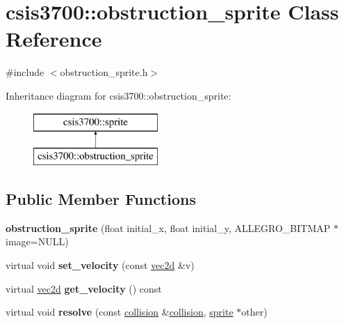 \hypertarget{classcsis3700_1_1obstruction__sprite}{\section{csis3700\-:\-:obstruction\-\_\-sprite Class Reference}
\label{classcsis3700_1_1obstruction__sprite}
}


{\ttfamily \#include $<$obstruction\-\_\-sprite.\-h$>$}

Inheritance diagram for csis3700\-:\-:obstruction\-\_\-sprite\-:\begin{figure}[H]
\begin{center}
\leavevmode
\includegraphics[height=2.000000cm]{classcsis3700_1_1obstruction__sprite}
\end{center}
\end{figure}
\subsection*{Public Member Functions}
\begin{DoxyCompactItemize}
\item 
\hypertarget{classcsis3700_1_1obstruction__sprite_a9d7f66afeeb3dba404c602b54eeb3308}{{\bfseries obstruction\-\_\-sprite} (float initial\-\_\-x, float initial\-\_\-y, A\-L\-L\-E\-G\-R\-O\-\_\-\-B\-I\-T\-M\-A\-P $\ast$image=N\-U\-L\-L)}\label{classcsis3700_1_1obstruction__sprite_a9d7f66afeeb3dba404c602b54eeb3308}

\item 
\hypertarget{classcsis3700_1_1obstruction__sprite_a6629cd0d13f54ed8666326ca55fb7c0c}{virtual void {\bfseries set\-\_\-velocity} (const \hyperlink{classcsis3700_1_1vec2d}{vec2d} \&v)}\label{classcsis3700_1_1obstruction__sprite_a6629cd0d13f54ed8666326ca55fb7c0c}

\item 
\hypertarget{classcsis3700_1_1obstruction__sprite_a4b2102c43b49b91b4186f074ebbcc886}{virtual \hyperlink{classcsis3700_1_1vec2d}{vec2d} {\bfseries get\-\_\-velocity} () const }\label{classcsis3700_1_1obstruction__sprite_a4b2102c43b49b91b4186f074ebbcc886}

\item 
\hypertarget{classcsis3700_1_1obstruction__sprite_a1ce0b8681cfb6020a332cd97843b4a88}{virtual void {\bfseries resolve} (const \hyperlink{classcsis3700_1_1collision}{collision} \&\hyperlink{classcsis3700_1_1collision}{collision}, \hyperlink{classcsis3700_1_1sprite}{sprite} $\ast$other)}\label{classcsis3700_1_1obstruction__sprite_a1ce0b8681cfb6020a332cd97843b4a88}

\end{DoxyCompactItemize}
